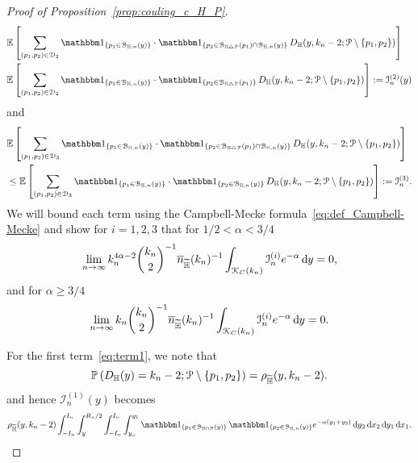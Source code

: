 \begin{proof}[Proof of Proposition~\ref{prop:couling_c_H_P}]
\begin{equation} \label{eq:term2}
\begin{split}
	&\Exp{\sum_{(p_1, p_2)\in \dom{2}} \ind{p_1 \in \BallHyp{y}} \cdot \ind{p_2 \in \BallSym{p_1}\cap \BallHyp{y}} 
		\, D_\H (y,k_n-2;\Pcal \setminus \{p_1,p_2\})} \\
	&\Exp{\sum_{(p_1, p_2)\in \dom{2}} \ind{p_1 \in \BallHyp{y}} \cdot \ind{p_2 \in \BallSym{p_1}} 
		\, D_\H (y,k_n-2;\Pcal \setminus \{p_1,p_2\})} := \mathcal{I}_n^{(2)}(y)
\end{split}
\end{equation}
and 
\begin{equation}\label{eq:term3}
\begin{split}
	&\Exp{\sum_{(p_1, p_2)\in \dom{3}} \ind{p_1 \in \BallHyp{y}} \cdot \ind{p_2 \in \BallSym{p_1}\cap \BallHyp{y}} 
		\, D_\H (y,k_n-2;\Pcal \setminus \{p_1,p_2\})} \\
	&\le \Exp{\sum_{(p_1, p_2)\in \dom{3}} \ind{p_1 \in \BallHyp{y}} \cdot \ind{p_2 \in \BallHyp{y}} 
		\, D_\H (y,k_n-2;\Pcal \setminus \{p_1,p_2\})} := \mathcal{I}_n^{(3)}.
\end{split}
\end{equation}
We will bound each term using the Campbell-Mecke formula~\eqref{eq:def_Campbell-Mecke} and show for $i = 1,2,3$ that for $1/2 < \alpha < 3/4$
\begin{equation}
	\lim_{n \to \infty} k_n^{4\alpha - 2} \binom{k_n}{2}^{-1} \overline{n}_{\widetilde{\mathbb{H}}}(k_n)^{-1} 
		\int_{{\mathcal K}_{C}(k_n)} \mathcal{I}_n^{(i)} e^{-\alpha} \operatorname{\mathrm{d}\hspace{-2pt}} y = 0,
\end{equation}
and for $\alpha \ge 3/4$
\begin{equation}
	\lim_{n \to \infty} k_n \binom{k_n}{2}^{-1} \overline{n}_{\widetilde{\mathbb{H}}}(k_n)^{-1} 
		\int_{{\mathcal K}_{C}(k_n)} \mathcal{I}_n^{(i)} e^{-\alpha} \operatorname{\mathrm{d}\hspace{-2pt}} y = 0.
\end{equation}

For the first term~\eqref{eq:term1}, we note that
\[ 
\mathbb{P}\left(D_{\mathbb{H}} (y)=k_n-2;{\mathcal P} \setminus \{p_1, p_2\}\right) =\rho_{\widetilde{\mathbb{H}}}(y,k_n-2).
\] 
and hence $\mathcal{I}_n^{(1)}(y)$ becomes
\begin{equation} \label{eq:1sum-expansion} 
\begin{split}
	\rho_{\HP}(y,k_n-2) \int_{-I_n}^{I_n} \int_y^{R_n/2}\int_{-I_n}^{I_n} \int_{y_\omega}^{y_1}
  	\ind{p_1 \in \BallInter{y}} \, \ind{p_2 \in \BallHyp{y}} 
  	e^{-\alpha (y_1 + y_2)} \dd y_2 \dd x_2 \dd y_1 \dd x_1.
\end{split}
\end{equation}


\end{proof}
